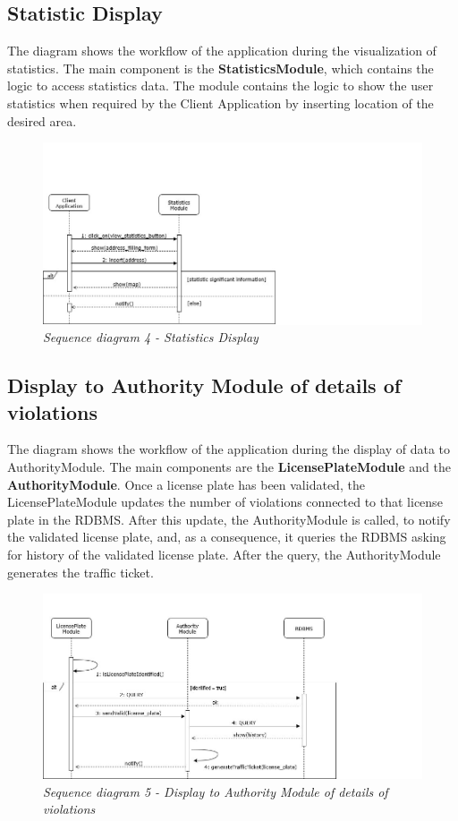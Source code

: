 \subsection{Statistic Display}
The diagram shows the workflow of the application during the visualization of statistics. The main component is the \textbf{StatisticsModule},
which contains the logic to access statistics data. The module contains the logic to show the user statistics when required by the Client Application
by inserting location of the desired area.

\begin{figure}[H]
  \centering
  \includegraphics[width=\textwidth]{DD_Images/RuntimeView/4.jpg}
  \caption{\textit{Sequence diagram 4 - Statistics Display}}
\end{figure}

\subsection{Display to Authority Module of details of violations}
The diagram shows the workflow of the application during the display of data to AuthorityModule. The main components are the 
\textbf{LicensePlateModule} and the \textbf{AuthorityModule}. Once a license plate has been validated, the LicensePlateModule updates the 
number of violations connected to that license plate in the RDBMS. After this update, the AuthorityModule is called, to notify the validated 
license plate, and, as a consequence, it queries the RDBMS asking for history of the validated license plate. After the query, the AuthorityModule 
generates the traffic ticket.

\begin{figure}[H]
  \centering
  \includegraphics[width=\textwidth]{DD_Images/RuntimeView/5.jpg}
  \caption{\textit{Sequence diagram 5 - Display to Authority Module of details of violations}}
\end{figure}


